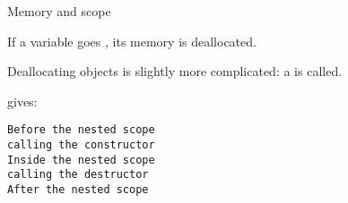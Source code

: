 
 {Memory and scope}

If a variable goes , its memory is
deallocated.

Deallocating objects is slightly more complicated: a
 is called.

%
gives:
\begin{verbatim}
Before the nested scope
calling the constructor
Inside the nested scope
calling the destructor
After the nested scope
\end{verbatim}
